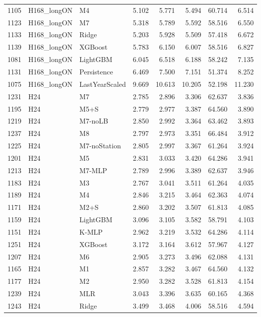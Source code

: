 \begin{tabular}{lllrrrrr}
1105 & H168_longON & M4 & 5.102 & 5.771 & 5.494 & 60.714 & 6.514 \\
1123 & H168_longON & M7 & 5.318 & 5.789 & 5.592 & 58.516 & 6.550 \\
1133 & H168_longON & Ridge & 5.203 & 5.928 & 5.509 & 57.418 & 6.672 \\
1139 & H168_longON & XGBoost & 5.783 & 6.150 & 6.007 & 58.516 & 6.827 \\
1081 & H168_longON & LightGBM & 6.045 & 6.518 & 6.188 & 58.242 & 7.135 \\
1131 & H168_longON & Persistence & 6.469 & 7.500 & 7.151 & 51.374 & 8.252 \\
1075 & H168_longON & LastYearScaled & 9.669 & 10.613 & 10.205 & 52.198 & 11.230 \\
1231 & H24 & M7 & 2.785 & 2.896 & 3.306 & 62.637 & 3.836 \\
1195 & H24 & M5+S & 2.779 & 2.977 & 3.387 & 64.560 & 3.890 \\
1219 & H24 & M7-noLB & 2.850 & 2.992 & 3.364 & 63.462 & 3.893 \\
1237 & H24 & M8 & 2.797 & 2.973 & 3.351 & 66.484 & 3.912 \\
1225 & H24 & M7-noStation & 2.805 & 2.997 & 3.367 & 61.264 & 3.924 \\
1201 & H24 & M5 & 2.831 & 3.033 & 3.420 & 64.286 & 3.941 \\
1213 & H24 & M7-MLP & 2.789 & 2.996 & 3.389 & 62.637 & 3.946 \\
1183 & H24 & M3 & 2.767 & 3.041 & 3.511 & 61.264 & 4.035 \\
1189 & H24 & M4 & 2.846 & 3.215 & 3.464 & 62.363 & 4.074 \\
1171 & H24 & M2+S & 2.860 & 3.202 & 3.507 & 61.813 & 4.085 \\
1159 & H24 & LightGBM & 3.096 & 3.105 & 3.582 & 58.791 & 4.103 \\
1151 & H24 & K-MLP & 2.962 & 3.219 & 3.532 & 64.286 & 4.114 \\
1251 & H24 & XGBoost & 3.172 & 3.164 & 3.612 & 57.967 & 4.127 \\
1207 & H24 & M6 & 2.905 & 3.273 & 3.496 & 62.088 & 4.131 \\
1165 & H24 & M1 & 2.857 & 3.282 & 3.467 & 64.560 & 4.132 \\
1177 & H24 & M2 & 2.950 & 3.282 & 3.528 & 61.813 & 4.154 \\
1239 & H24 & MLR & 3.043 & 3.396 & 3.635 & 60.165 & 4.368 \\
1243 & H24 & Ridge & 3.499 & 3.468 & 4.006 & 58.516 & 4.594 \\

\end{tabular}
